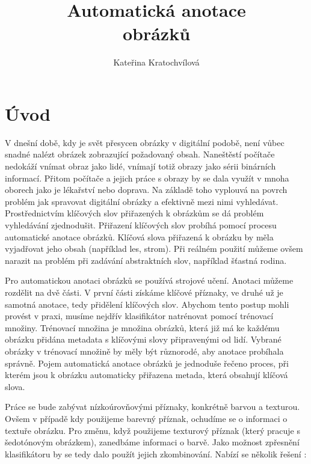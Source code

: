 \documentclass[czech,BP]{thesiskiv}
\author{Kateřina Kratochvílová}
\title{Automatická anotace\\obrázků}
\begin{document}
%
\maketitle
\tableofcontents
{}
\thispagestyle{empty}


\chapter{Úvod}
\setcounter{page}{1}
\par V dnešní době, kdy je svět přesycen obrázky v digitální podobě, není vůbec snadné nalézt obrázek zobrazující požadovaný obsah. Naneštěstí počítače nedokáží vnímat obraz jako lidé, vnímají totiž obrazy jako sérii binárních informací. Přitom počítače a jejich práce s obrazy by se dala využít v mnoha oborech jako je lékařství nebo doprava. Na základě toho vyplouvá na povrch problém jak spravovat digitální obrázky a efektivně mezi nimi vyhledávat. Prostřednictvím klíčových slov přiřazených k obrázkům se dá problém vyhledávání zjednodušit. Přiřazení klíčových slov probíhá pomocí procesu automatické anotace obrázků. Klíčová slova přiřazená k obrázku by měla vyjadřovat jeho obsah (například les, strom). Při reálném použití můžeme ovšem narazit na problém při zadávání abstraktních slov, například šťastná rodina.  

\par Pro automatickou anotaci obrázků se používá strojové učení. Anotaci můžeme rozdělit na dvě části. V první části získáme klíčové příznaky, ve druhé už je samotná anotace, tedy přidělení klíčových slov. Abychom tento postup mohli provést v praxi, musíme nejdřív klasifikátor natrénovat pomocí trénovací množiny. Trénovací množina je množina obrázků, která již má ke každému obrázku přidána metadata s klíčovými slovy připravenými od lidí. Vybrané obrázky v trénovací množině by měly být různorodé, aby anotace probíhala správně. Pojem automatická anotace obrázků je jednoduše řečeno proces, při kterém jsou k obrázku automaticky přiřazena metada, která obsahují klíčová slova. 

\par Práce se bude zabývat nízkoúrovňovými příznaky, konkrétně barvou a texturou. Ovšem v případě kdy použijeme barevný příznak, ochudíme se o informaci o textuře obrázku. Pro změnu, když použijeme texturový příznak (který pracuje s šedotónovým obrázkem), zanedbáme informaci o barvě. Jako možnost zpřesnění klasifikátoru by se tedy dalo použít jejich zkombinování. Nabízí se několik řešení \cite{DiplomovaBrno}:   
\end{document}
